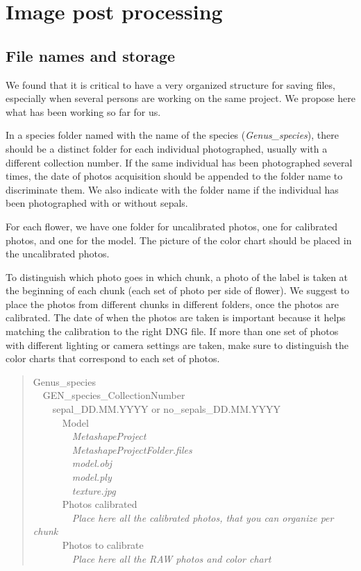 \documentclass[
]{book}
\begin{document}
\hypertarget{image-post-processing}{%
\chapter{Image post processing}\label{image-post-processing}}

\hypertarget{file-names-and-storage}{%
\section{File names and storage}\label{file-names-and-storage}}

We found that it is critical to have a very organized structure for
saving files, especially when several persons are working on the same
project. We propose here what has been working so far for us.

In a species folder named with the name of the species
(\emph{Genus\_species}), there should be a distinct folder for each individual
photographed, usually with a different collection number. If the same
individual has been photographed several times, the date of photos
acquisition should be appended to the folder name to discriminate them.
We also indicate with the folder name if the individual has been
photographed with or without sepals.

For each flower, we have one folder for uncalibrated photos, one for
calibrated photos, and one for the model. The picture of the color chart
should be placed in the uncalibrated photos.

To distinguish which photo goes in which chunk, a photo of the label is
taken at the beginning of each chunk (each set of photo per side of
flower). We suggest to place the photos from different chunks in
different folders, once the photos are calibrated. The date of when the
photos are taken is important because it helps matching the calibration
to the right DNG file. If more than one set of photos with different
lighting or camera settings are taken, make sure to distinguish the
color charts that correspond to each set of photos.

\begin{quote}
Genus\_species\\
 GEN\_species\_CollectionNumber\\
  sepal\_DD.MM.YYYY or no\_sepals\_DD.MM.YYYY\\
   Model\\
    \emph{MetashapeProject}\\
    \emph{MetashapeProjectFolder.files}\\
    \emph{model.obj}\\
    \emph{model.ply}\\
    \emph{texture.jpg}\\
   Photos calibrated\\
    \emph{Place here all the calibrated photos, that you can organize per chunk}\\
   Photos to calibrate\\
    \emph{Place here all the RAW photos and color chart}\\
\end{quote}
\end{document}
